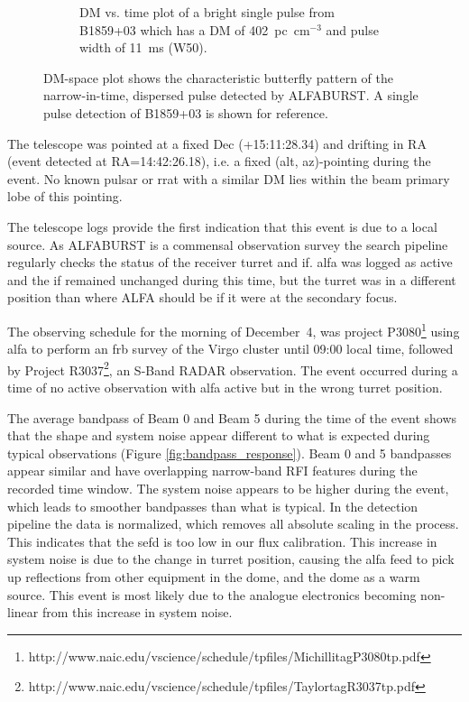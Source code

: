 \documentclass[a4paper,fleqn,usenatbib]{mnras}
\begin{document}
\begin{figure}
\begin{subfigure}[t]{0.5\textwidth}
        \caption{DM vs. time plot of a bright single pulse from B1859+03 which
        has a DM of 402~pc~cm$^{-3}$ and pulse width of 11~ms (W50).
        }
        \label{fig:dm_time_B1859}
    \end{subfigure}
    \caption{DM-space plot shows the characteristic butterfly pattern of the
    narrow-in-time, dispersed pulse detected by ALFABURST. A single pulse
    detection of B1859+03 is shown for reference.
    }
    \label{fig:dm_time}
\end{figure}

The telescope was pointed at a fixed Dec (+15:11:28.34) and drifting in RA
(event detected at RA=14:42:26.18), i.e. a fixed (alt, az)-pointing during the
event. No known pulsar or \gls{rrat} with a similar DM lies within the beam
primary lobe of this pointing.

The telescope logs provide the first indication that this event is due to a
local source. As ALFABURST is a commensal observation survey the search pipeline
regularly checks the status of the receiver turret and \gls{if}. \gls{alfa} was
logged as active and the \gls{if} remained unchanged during this time, but the
turret was in a different position than where ALFA should be if it were at the
secondary focus.

The observing schedule for the morning of December~4, was project
P3080\footnote{http://www.naic.edu/vscience/schedule/tpfiles/MichillitagP3080tp.pdf}
using \gls{alfa} to perform an \gls{frb} survey of the Virgo cluster until 09:00
local time, followed by Project
R3037\footnote{http://www.naic.edu/vscience/schedule/tpfiles/TaylortagR3037tp.pdf},
an S-Band RADAR observation.  The event occurred during a time of no active
observation with \gls{alfa} active but in the wrong turret position.

The average bandpass of Beam 0 and Beam 5 during the time of the event shows
that the shape and system noise appear different to what is expected during
typical observations (Figure \ref{fig:bandpass_response}).  Beam 0 and 5
bandpasses appear similar and have overlapping narrow-band RFI features during
the recorded time window.  The system noise appears to be higher during the
event, which leads to smoother bandpasses than what is typical.  In the
detection pipeline the data is normalized, which removes all absolute scaling in
the process. This indicates that the \gls{sefd} is too low in our flux
calibration.  This increase in system noise is due to the change in turret
position, causing the \gls{alfa} feed to pick up reflections from other
equipment in the dome, and the dome as a warm source.  This event is most likely
due to the analogue electronics becoming non-linear from this increase in system
noise.
\end{document}
